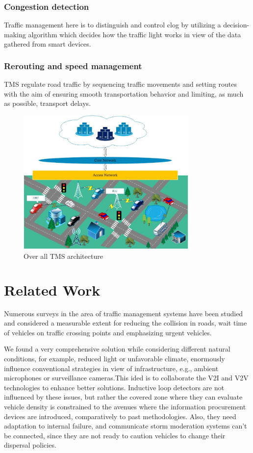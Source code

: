 \documentclass[conference]{IEEEtran}
\begin{document}
\subsubsection{Congestion detection}
Traffic management here is to distinguish and control clog by utilizing a decision-making algorithm which decides how the traffic light works in view of the data gathered from smart devices.
\subsubsection{Rerouting and speed management}
TMS regulate road traffic by sequencing traffic movements and setting routes with the aim of ensuring smooth transportation behavior and limiting, as much as possible, transport delays.




\begin{figure}[!ht]
\centering
\includegraphics[width=3.5in]{wireless_traffice}
\caption{Over all TMS architecture}
\label{wireless}
\end{figure}



\section{Related Work}
Numerous surveys in the area of traffic management systems have been studied and considered a measurable extent for reducing the collision in roads, wait time of vehicles on traffic crossing points and emphasizing urgent vehicles.

We found a very comprehensive solution \cite{sanguesa2015sensing} while considering different natural conditions, for example, reduced light or unfavorable climate, enormously influence conventional strategies in view of infrastructure, e.g., ambient microphones or surveillance cameras.This ided is to collaborate the V2I and V2V technologies to enhance better solutions. Inductive loop detectors are not influenced by these issues, but rather the covered zone where they can evaluate vehicle density is constrained to the avenues where the information procurement devices are introduced, comparatively to past methodologies. Also, they need adaptation to internal failure, and communicate storm moderation systems can't be connected, since they are not ready to caution vehicles to change their dispersal policies. 
\end{document}
